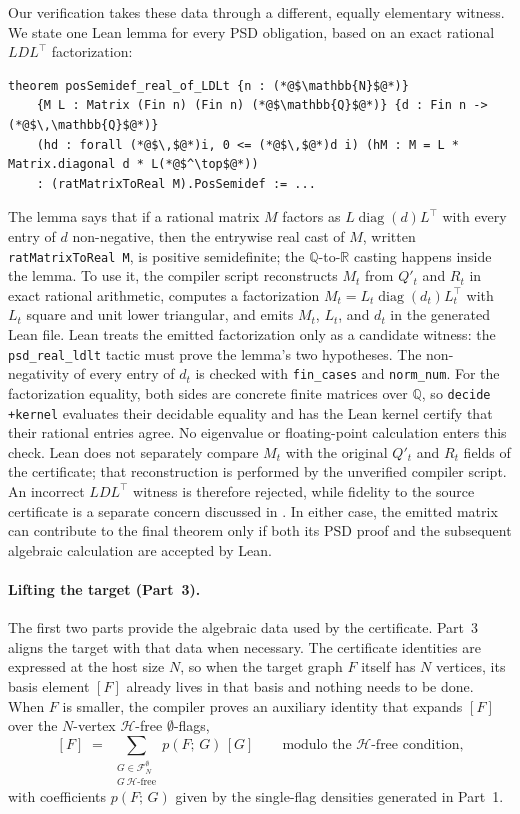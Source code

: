 \documentclass{article}
\newcommand{\den}[2]{p(#1;\,#2)}
\newcommand{\lean}[1]{\texttt{#1}}
\begin{document}
Our verification takes these data through a different, equally elementary
witness.  We state one Lean lemma for every PSD obligation, based on an exact
rational $LDL^\top$ factorization:
\begin{lstlisting}
theorem posSemidef_real_of_LDLt {n : (*@$\mathbb{N}$@*)}
    {M L : Matrix (Fin n) (Fin n) (*@$\mathbb{Q}$@*)} {d : Fin n -> (*@$\,\mathbb{Q}$@*)}
    (hd : forall (*@$\,$@*)i, 0 <= (*@$\,$@*)d i) (hM : M = L * Matrix.diagonal d * L(*@$^\top$@*))
    : (ratMatrixToReal M).PosSemidef := ...
\end{lstlisting}
The lemma says that if a rational matrix $M$ factors as
$L\operatorname{diag}(d)L^\top$ with every entry of $d$ non-negative, then the
entrywise real cast of $M$, written \lean{ratMatrixToReal M}, is positive
semidefinite; the $\mathbb{Q}$-to-$\mathbb{R}$ casting happens inside the
lemma.  To use it, the compiler script reconstructs $M_t$ from $Q'_t$ and
$R_t$ in exact rational arithmetic, computes a factorization
$M_t=L_t\operatorname{diag}(d_t)L_t^\top$ with $L_t$ square and unit lower
triangular, and emits $M_t$, $L_t$, and $d_t$ in the generated Lean file.
Lean treats the emitted factorization only as a candidate witness: the
\lean{psd\_real\_ldlt} tactic must prove the lemma's two hypotheses.  The
non-negativity of every entry of $d_t$ is checked with \lean{fin\_cases} and
\lean{norm\_num}.  For the factorization equality, both sides are concrete
finite matrices over $\mathbb{Q}$, so \lean{decide +kernel} evaluates their
decidable equality and has the Lean kernel certify that their rational
entries agree.  No eigenvalue or floating-point calculation enters this
check.  Lean does not separately compare $M_t$ with the original $Q'_t$ and
$R_t$ fields of the certificate; that reconstruction is performed by the
unverified compiler script.  An incorrect $LDL^\top$ witness is therefore
rejected, while fidelity to the source certificate is a separate concern
discussed in .  In either case, the emitted matrix
can contribute to the final theorem only if both its PSD proof and the
subsequent algebraic calculation are accepted by Lean.

\paragraph{Lifting the target (Part~3).}
The first two parts provide the algebraic data used by the certificate.  Part~3
aligns the target with that data when necessary.  The certificate identities
are expressed at the host size $N$, so when the target graph $F$ itself has
$N$ vertices, its basis element $[F]$ already lives in that basis and nothing
needs to be done.  When $F$ is smaller, the compiler proves an auxiliary
identity that expands $[F]$ over the $N$-vertex $\mathcal{H}$-free
$\emptyset$-flags,
\[
  [F]
  \;=\;
  \sum_{\substack{G \in \mathcal{F}^{\emptyset}_{N} \\ G\ \mathcal{H}\text{-free}}}
  \den{F}{G}\,[G]
  \qquad\text{modulo the \(\mathcal{H}\)-free condition,}
\]
with coefficients $\den{F}{G}$ given by the single-flag densities
generated in Part~1.
\end{document}
